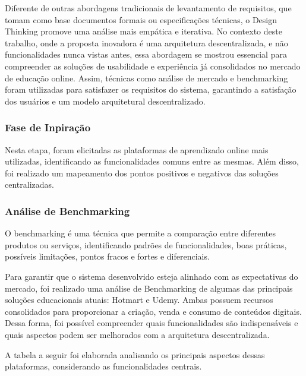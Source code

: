 Diferente de outras abordagens tradicionais de levantamento de requisitos, que tomam como base documentos formais ou especificações técnicas, o Design Thinking promove uma análise mais empática e iterativa. No contexto deste trabalho, onde a proposta inovadora é uma arquitetura descentralizada, e não funcionalidades nunca vistas antes, essa abordagem se mostrou essencial para compreender as soluções de usabilidade e experiência já consolidados no mercado de educação online. Assim, técnicas como análise de mercado e benchmarking foram utilizadas para satisfazer os requisitos do sistema, garantindo a satisfação dos usuários e um modelo arquitetural descentralizado.

\subsubsection{Fase de Inpiração}
Nesta etapa, foram elicitadas as plataformas de aprendizado online mais utilizadas, identificando as funcionalidades comuns entre as mesmas. Além disso, foi realizado um mapeamento dos pontos positivos e negativos das soluções centralizadas.

\subsubsection{Análise de Benchmarking}
O benchmarking é uma técnica que permite a comparação entre diferentes produtos ou serviços, identificando padrões de funcionalidades, boas práticas, possíveis limitações, pontos fracos e fortes e diferenciais.

Para garantir que o sistema desenvolvido esteja alinhado com as expectativas do mercado, foi realizado uma análise de Benchmarking de algumas das principais soluções educacionais atuais: Hotmart e Udemy. Ambas possuem recursos consolidados para proporcionar a criação, venda e consumo de conteúdos digitais. Dessa forma, foi possível compreender quais funcionalidades são indispensáveis e quais aspectos podem ser melhorados com a arquitetura descentralizada.

A tabela a seguir foi elaborada analisando os principais aspectos dessas plataformas, considerando as funcionalidades centrais.


